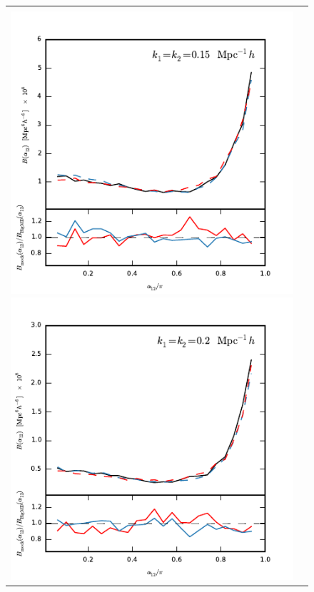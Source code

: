 \documentclass[english,usenatbib]{mn2e}
\begin{document}
\begin{figure}
\begin{tabular}{cc}
\vspace{-0.93cm}
\\
\hspace{-0.4cm}
\includegraphics[width=1.1\columnwidth]{bispec2}
\includegraphics[width=1.1\columnwidth]{bispec5}

\end{tabular}
\end{figure}
\end{document}
